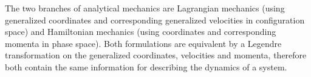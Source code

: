 
{\small
\setlength{\abovedisplayskip}{2pt}\setlength{\belowdisplayskip}{2pt}
The two branches of analytical mechanics are
Lagrangian mechanics
(using generalized coordinates and corresponding generalized velocities in configuration space)
and Hamiltonian mechanics
(using coordinates and corresponding momenta in phase space).
Both formulations are equivalent
by a Legendre transformation
on the generalized coordinates,
velocities and momenta,
therefore both contain the same information
for describing the dynamics
of a system.

\par}

